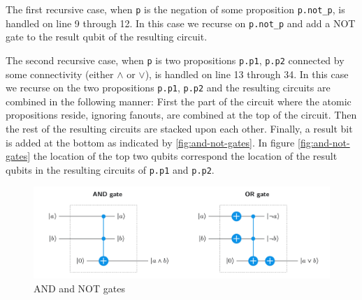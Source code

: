 The first recursive case, when \texttt{p} is the negation of some proposition \texttt{p.not\_p}, is handled on line 9 through 12.
In this case we recurse on \texttt{p.not\_p} and add a NOT gate to the result qubit of the resulting circuit.

The second recursive case, when \texttt{p} is two propositions \texttt{p.p1}, \texttt{p.p2} connected by some connectivity (either $\land$ or $\lor$), is handled on line 13 through 34.
In this case we recurse on the two propositions \texttt{p.p1}, \texttt{p.p2} and the resulting circuits are combined in the following manner:
First the part of the circuit where the atomic propositions reside, ignoring fanouts, are combined at the top of the circuit.
Then the rest of the resulting circuits are stacked upon each other.
Finally, a result bit is added at the bottom as indicated by \autoref{fig:and-not-gates}.
In figure \autoref{fig:and-not-gates} the location of the top two qubits correspond the location of the result qubits in the resulting circuits of \texttt{p.p1} and \texttt{p.p2}.

\begin{figure}[H]
    \centering
    \includegraphics[width=\textwidth]{figures/AND-and-OR-with-Toffoli.jpg}
    \caption{AND and NOT gates}
    \label{fig:and-not-gates}
\end{figure}

